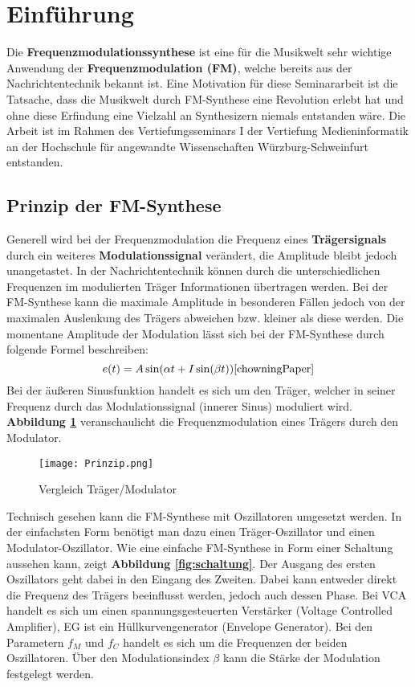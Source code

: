 \newpage
\section{Einführung}
Die \textbf{Frequenzmodulationssynthese} ist eine für die Musikwelt sehr wichtige Anwendung der \textbf{Frequenzmodulation (FM)}, welche bereits aus der Nachrichtentechnik bekannt ist. Eine Motivation für diese Seminararbeit ist die Tatsache, dass die Musikwelt durch FM-Synthese eine Revolution erlebt hat und ohne diese Erfindung eine Vielzahl an Synthesizern niemals entstanden wäre. Die Arbeit ist im Rahmen des Vertiefungsseminars I der Vertiefung Medieninformatik an der Hochschule für angewandte Wissenschaften Würzburg-Schweinfurt entstanden. %
\FloatBarrier
\subsection{Prinzip der FM-Synthese}
\label{PrinzipFM}
Generell wird bei der Frequenzmodulation die Frequenz eines \textbf{Trägersignals} durch ein weiteres \textbf{Modulationssignal} verändert, die Amplitude bleibt jedoch unangetastet. In der Nachrichtentechnik können durch die unterschiedlichen Frequenzen im modulierten Träger Informationen übertragen werden. Bei der FM-Synthese kann die maximale Amplitude in besonderen Fällen jedoch von der maximalen Auslenkung des Trägers abweichen bzw. kleiner als diese werden. 
Die momentane Amplitude der Modulation lässt sich bei der FM-Synthese durch folgende Formel beschreiben:
\begin{equation}
e(t) = A\sin(\alpha t + I\sin(\beta t)) \cite{chowningPaper}
\end{equation}
Bei der äußeren Sinusfunktion handelt es sich um den Träger, welcher in seiner Frequenz durch das Modulationssignal (innerer Sinus) moduliert wird. \textbf{Abbildung \ref{fig:vergleichSignale}} veranschaulicht die Frequenzmodulation eines Trägers durch den Modulator.

\begin{figure} [ht]
\centering
  \texttt{[image: Prinzip.png]}
\caption{Vergleich Träger/Modulator}
\label{fig:vergleichSignale}
\end{figure}
\FloatBarrier

Technisch gesehen kann die FM-Synthese mit Oszillatoren umgesetzt werden. In der einfachsten Form benötigt man dazu einen Träger-Oszillator und einen Modulator-Oszillator. Wie eine einfache FM-Synthese in Form einer Schaltung aussehen kann, zeigt \textbf{Abbildung \ref{fig:schaltung}}. Der Ausgang des ersten Oszillators geht dabei in den Eingang des Zweiten. Dabei kann entweder direkt die Frequenz des Trägers beeinflusst werden, jedoch auch dessen Phase. Bei VCA handelt es sich um einen spannungsgesteuerten Verstärker (Voltage Controlled Amplifier), EG ist ein Hüllkurvengenerator (Envelope Generator). Bei den Parametern $f_M$ und $f_C$ handelt es sich um die Frequenzen der beiden Oszillatoren. Über den Modulationsindex $\beta$ kann die Stärke der Modulation festgelegt werden. 

